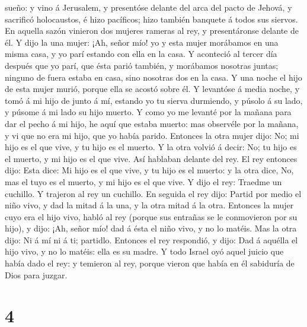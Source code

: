 sueño: y vino á Jerusalem, y presentóse delante del arca del pacto de
Jehová, y sacrificó holocaustos, é hizo pacíficos; hizo también banquete
á todos sus siervos.  En aquella sazón vinieron dos mujeres
rameras al rey, y presentáronse delante de él.  Y dijo la
una mujer: ¡Ah, señor mío! yo y esta mujer morábamos en una misma casa,
y yo parí estando con ella en la casa.  Y aconteció al
tercer día después que yo parí, que ésta parió también, y morábamos
nosotras juntas; ninguno de fuera estaba en casa, sino nosotras dos en
la casa.  Y una noche el hijo de esta mujer murió, porque
ella se acostó sobre él.  Y levantóse á media noche, y tomó
á mi hijo de junto á mí, estando yo tu sierva durmiendo, y púsolo á su
lado, y púsome á mi lado su hijo muerto.  Y como yo me
levanté por la mañana para dar el pecho á mi hijo, he aquí que estaba
muerto: mas observéle por la mañana, y vi que no era mi hijo, que yo
había parido.  Entonces la otra mujer dijo: No; mi hijo es
el que vive, y tu hijo es el muerto. Y la otra volvió á decir: No; tu
hijo es el muerto, y mi hijo es el que vive. Así hablaban delante del
rey.  El rey entonces dijo: Esta dice: Mi hijo es el que
vive, y tu hijo es el muerto: y la otra dice, No, mas el tuyo es el
muerto, y mi hijo es el que vive.  Y dijo el rey: Traedme
un cuchillo. Y trajeron al rey un cuchillo.  En seguida el
rey dijo: Partid por medio el niño vivo, y dad la mitad á la una, y la
otra mitad á la otra.  Entonces la mujer cuyo era el hijo
vivo, habló al rey (porque sus entrañas se le conmovieron por su hijo),
y dijo: ¡Ah, señor mío! dad á ésta el niño vivo, y no lo matéis. Mas la
otra dijo: Ni á mí ni á ti; partidlo.  Entonces el rey
respondió, y dijo: Dad á aquélla el hijo vivo, y no lo matéis: ella es
su madre.  Y todo Israel oyó aquel juicio que había dado el
rey: y temieron al rey, porque vieron que había en él sabiduría de Dios
para juzgar.

\hypertarget{section-3}{%
\section{4}\label{section-3}}

